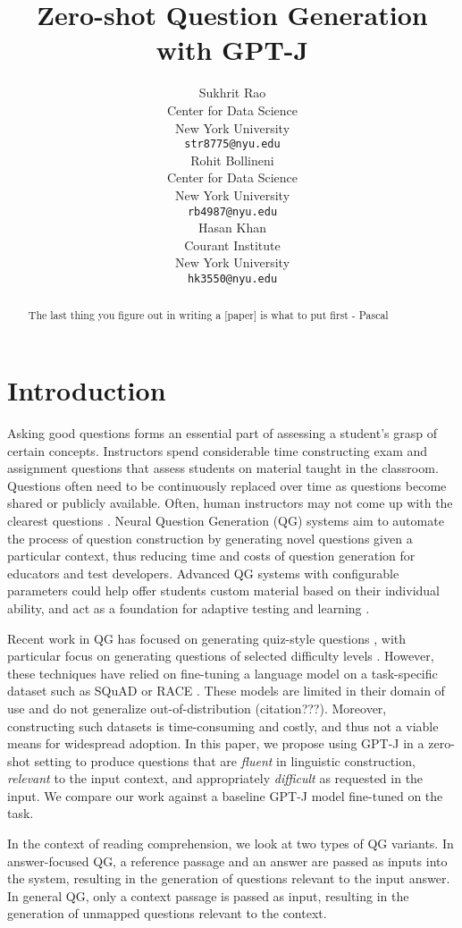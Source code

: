 \documentclass[11pt]{article}
\title{Zero-shot Question Generation with GPT-J}
\author{Sukhrit Rao \\
  Center for Data Science \\
  New York University \\
  \texttt{str8775@nyu.edu} \\\And
  Rohit Bollineni \\
  Center for Data Science \\
  New York University \\
  \texttt{rb4987@nyu.edu} \\\And
  Hasan Khan \\
  Courant Institute \\ 
  New York University \\
  \texttt{hk3550@nyu.edu} \\}
\begin{document}
\maketitle
\begin{abstract}
The last thing you figure out in writing a [paper] is what to put first - Pascal
\end{abstract}

\section{Introduction}

Asking good questions forms an essential part of assessing a student’s grasp of certain concepts. Instructors spend considerable time constructing exam and assignment questions that assess students on material taught in the classroom. Questions often need to be continuously replaced over time as questions become shared or publicly available. Often, human instructors may not come up with the clearest questions \citep{human-eval:7}. Neural Question Generation (QG) systems aim to automate the process of question construction by generating novel questions given a particular context, thus reducing time and costs of question generation for educators and test developers. Advanced QG systems with configurable parameters could help offer students custom material based on their individual ability, and act as a foundation for adaptive testing and learning \citep{adaptive-education:8}. 

Recent work in QG has focused on generating quiz-style questions \citep{Quiz:1}, with particular focus on generating questions of selected difficulty levels \citep{Difficulty:3}. However, these techniques have relied on fine-tuning a language model on a task-specific dataset such as SQuAD or RACE \citep{RACE:2}. These models are limited in their domain of use and do not generalize out-of-distribution (citation???). Moreover, constructing such datasets is time-consuming and costly, and thus not a viable means for widespread adoption. In this paper, we propose using GPT-J in a zero-shot setting to produce questions that are \textit{fluent} in linguistic construction, \textit{relevant} to the input context, and appropriately \textit{difficult} as requested in the input. We compare our work against a baseline GPT-J model fine-tuned on the task.

In the context of reading comprehension, we look at two types of QG variants. In answer-focused QG, a reference passage and an answer are passed as inputs into the system, resulting in the generation of questions relevant to the input answer. In general QG, only a context passage is passed as input, resulting in the generation of unmapped questions relevant to the context.
\end{document}

